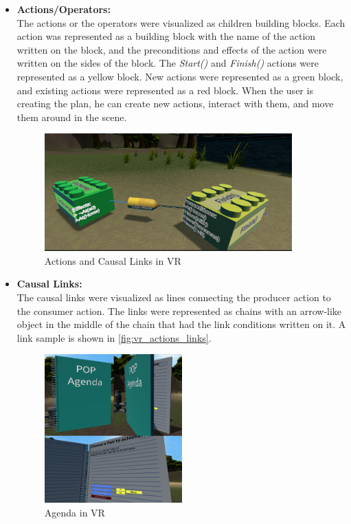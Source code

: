 \begin{itemize}
    \item \textbf{Actions/Operators:} \\
          The actions or the operators were visualized as children building blocks. Each action was represented as a building block with the name of the action written on the block, and the preconditions and effects of the action were written on the sides of the block. The \textit{Start()} and \textit{Finish()} actions were represented as a yellow block. New actions were represented as a green block, and existing actions were represented as a red block. When the user is creating the plan, he can create new actions, interact with them, and move them around in the scene.

          \begin{figure}[H]
              \centering
              \includegraphics[width=0.9\textwidth]{images/VR_Actions_Links.png}
              \caption[Actions and Causal Links in VR]{Actions and Causal Links in VR}
              \label{fig:vr_actions_links}
          \end{figure}

    \item \textbf{Causal Links:} \\
          The causal links were visualized as lines connecting the producer action to the consumer action. The links were represented as chains with an arrow-like object in the middle of the chain that had the link conditions written on it. A link sample is shown in \autoref{fig:vr_actions_links}.

          \begin{figure}[H]
              \centering
              \includegraphics[width=0.5\textwidth]{images/Agenda.jpg}
              \caption[Agenda in VR]{Agenda in VR}
              \label{fig:vr_agenda}
          \end{figure}


\end{itemize}
